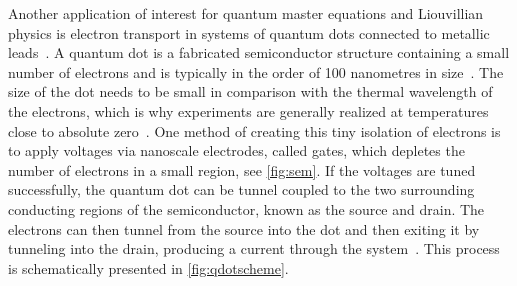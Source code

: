 \documentclass[../main.tex]{subfiles}
\begin{document}
Another application of interest for quantum master equations and Liouvillian physics is electron transport in systems of quantum dots connected to metallic leads~\cite{qdottrans}. A quantum dot is a fabricated semiconductor structure containing a small number of electrons and is typically in the order of 100 nanometres in size~\cite{qdotmarcus}. The size of the dot needs to be small in comparison with the thermal wavelength of the electrons, which is why experiments are generally realized at temperatures close to absolute zero~\cite{transport}. One method of creating this tiny isolation of electrons is to apply voltages via nanoscale electrodes, called gates, which depletes the number of electrons in a small region, see \cref{fig:sem}. If the voltages are tuned successfully, the quantum dot can be tunnel coupled to the two surrounding conducting regions of the semiconductor, known as the source and drain. The electrons can then tunnel from the source into the dot and then exiting it by tunneling into the drain, producing a current through the system~\cite{qdotmarcus}. This process is schematically presented in \cref{fig:qdotscheme}.
\end{document}
